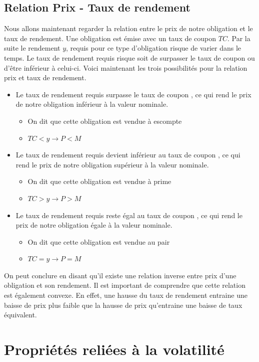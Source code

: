 \documentclass[12pt]{article}
\begin{document}
\section{Relation Prix - Taux de rendement}
Nous allons maintenant regarder la relation entre le prix de notre obligation et le taux de rendement. Une obligation est émise avec un taux de coupon $TC$. Par la suite le rendement $y$, requis pour ce type d'obligation risque de varier dans le temps. Le taux de rendement requis risque soit de surpasser le taux de coupon ou d'être inférieur à celui-ci. Voici maintenant les trois possibilités pour la relation prix et taux de rendement. 
\begin{itemize}
\item Le taux de rendement requis surpasse le taux de coupon , ce qui rend le prix de notre obligation inférieur à la valeur nominale. 
\begin{itemize}
\item On dit que cette obligation est vendue à escompte 
\item $TC < y \rightarrow P < M$
\end{itemize}
\item Le taux de rendement requis devient inférieur au taux de coupon , ce qui rend le prix de notre obligation supérieur à la valeur nominale. 
\begin{itemize}
\item On dit que cette obligation est vendue à prime
\item $TC > y \rightarrow P > M$
\end{itemize}
\item Le taux de rendement requis reste égal au taux de coupon , ce qui rend le prix de notre obligation égale à la valeur nominale. 
\begin{itemize}
\item On dit que cette obligation est vendue au pair
\item $TC = y \rightarrow P = M$
\end{itemize}
\end{itemize}
On peut conclure en disant qu'il existe une relation inverse entre prix d'une obligation et son rendement. Il est important de comprendre que cette relation est également convexe. En effet, une hausse du taux de rendement entraine une baisse de prix plus faible que la hausse de prix qu'entraine une baisse de taux équivalent.

\chapter{Propriétés reliées à la volatilité}
\end{document}
